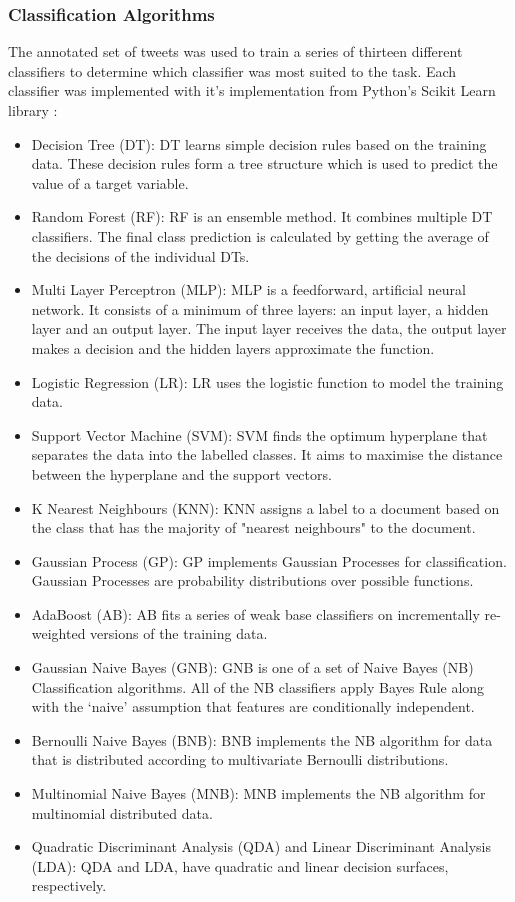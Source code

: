\subsubsection{Classification Algorithms}
The annotated set of tweets was used to train a series of thirteen different classifiers to determine which classifier was most suited to the task. Each classifier was implemented with it's implementation from Python's Scikit Learn library \cite{scikit-learn}:
\begin{itemize}
    \item Decision Tree (DT): DT learns simple decision rules based on the training data. These decision rules form a tree structure which is used to predict the value of a target variable.
    \item Random Forest (RF): RF is an ensemble method. It combines multiple DT classifiers. The final class prediction is calculated by getting the average of the decisions of the individual DTs.
    \item Multi Layer Perceptron (MLP): MLP is a feedforward, artificial neural network. It consists of a minimum of three layers: an input layer, a hidden layer and an output layer. The input layer receives the data, the output layer makes a decision and the hidden layers approximate the function.
    \item Logistic Regression (LR): LR uses the logistic function to model the training data. 
    \item Support Vector Machine (SVM): SVM finds the optimum hyperplane that separates the data into the labelled classes. It aims to maximise the distance between the hyperplane and the support vectors.
    \item K Nearest Neighbours (KNN): KNN assigns a label to a document based on the class that has the majority of "nearest neighbours" to the document.
    \item Gaussian Process (GP): GP implements Gaussian Processes for classification. Gaussian Processes are probability distributions over possible functions.
    \item AdaBoost (AB): AB fits a series of weak base classifiers on incrementally re-weighted versions of the training data.
    \item Gaussian Naive Bayes (GNB): GNB is one of a set of Naive Bayes (NB) Classification algorithms. All of the NB classifiers apply Bayes Rule along with the ‘naive’ assumption that features are conditionally independent.
    \item Bernoulli Naive Bayes (BNB): BNB implements the NB algorithm for data that is distributed according to multivariate Bernoulli distributions.
    \item Multinomial Naive Bayes (MNB): MNB implements the NB algorithm for multinomial distributed data.
    \item Quadratic Discriminant Analysis (QDA) and Linear Discriminant Analysis (LDA): QDA and LDA, have quadratic and linear decision surfaces, respectively.
\end{itemize}

